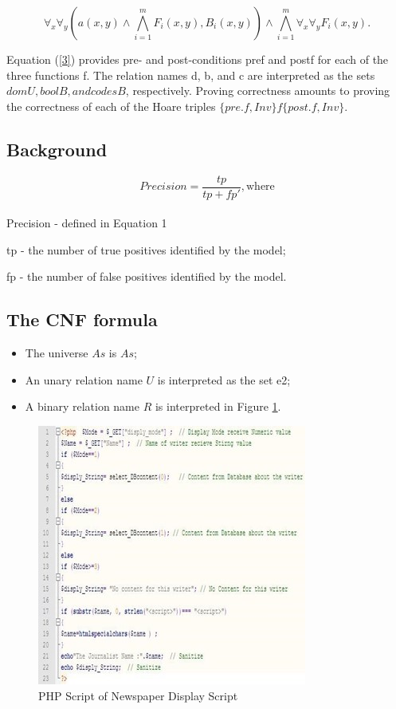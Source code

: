\documentclass[12pt]{acmart}
\begin{document}
\begin{equation}
    \forall_x \forall_y (a(x,y) \wedge \bigwedge_{i=1}^mF_i(x,y), B_i(x,y)) \wedge \bigwedge_{i=1}^m \forall_x \forall_y F_i(x,y).
    \label{2}
\end{equation}
 
 Equation (\ref{3}) provides pre- and post-conditions pref and postf for each of the three functions f. The relation names d, b, and c are interpreted as the sets $domU   , boolB, and codesB$, respectively. Proving correctness amounts to proving the correctness of each of the Hoare triples $\{pre.f, Inv\}  f  \{post.f, Inv\}$.

\subsection{Background}

\begin{equation}
    Precision = \frac{tp}{tp + fp'},
    \text{where}
    \label{3}
\end{equation}\\

Precision - defined in Equation 1\par
    tp - the number of true positives identified by the model;\par
	fp - the number of false positives identified by the model.

\subsection{The CNF formula}

\begin{itemize}
    \item The universe $As$ is $As$;
    \item An unary relation name $U$ is interpreted as the set e2;
    \item A binary relation name $R$ is interpreted in Figure \ref{pic2}.
\end{itemize}

\begin{figure}[H]
    \centering
    \includegraphics{Picture2.jpg}
    \caption{PHP Script of Newspaper Display Script}
    \label{pic2}
\end{figure}
\end{document}
